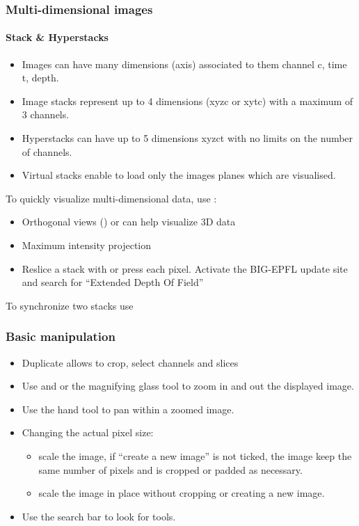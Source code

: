 \documentclass[ignorenonframetext,aspectratio=169,10pt,xcolor=table]{beamer}
\begin{document}
\begin{frame} \frametitle{Multi-dimensional images}
  \framesubtitle{Stack \& Hyperstacks}
  \begin{itemize}
  \item Images can have many dimensions (axis) associated to them
    channel c, time t, depth.
  \item Image stacks represent up to 4 dimensions (xyzc or xytc) with
    a maximum of 3 channels.
  \item Hyperstacks can have up to 5 dimensions xyzct with no limits
    on the number of channels.
  \item Virtual stacks enable to load only the images planes which are
    visualised.
  \end{itemize} To quickly visualize multi-dimensional data, use :
  \begin{itemize}
  \item Orthogonal views () or
     can help visualize 3D data
  \item Maximum intensity projection 
  \item Reslice a stack with  or press
    \keys{/}
    each pixel. Activate the BIG-EPFL update site and search for
    ``Extended Depth Of Field''
  \end{itemize} To synchronize two stacks use
\end{frame}

\begin{frame} \frametitle{Basic manipulation}
  \begin{itemize}
  \item Duplicate  allows to crop, select
    channels and slices
  \item Use \keys{{+}} and \keys{-} or the magnifying glass tool to zoom
    in and out the displayed image.
  \item Use the hand tool to pan within a zoomed image.
  \item Changing the actual pixel size:
    \begin{itemize}
    \item {} scale the image, if ``create a new
      image'' is not ticked, the image keep the same number of pixels and is
      cropped or padded as necessary.
    \item {} scale the image in place
      without cropping or creating a new image.
    \end{itemize}
  \item Use the search bar to look for tools.
  \end{itemize}
\end{frame}
\end{document}
